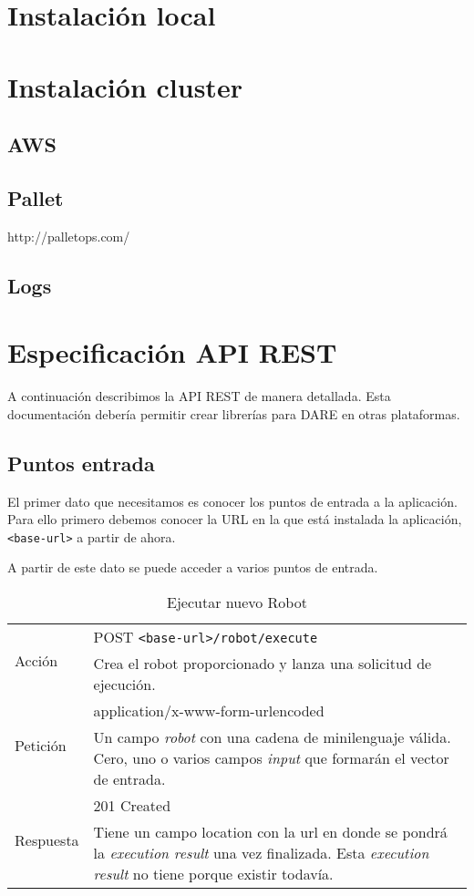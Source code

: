 \section{Instalación local}
\section{Instalación cluster}
\subsection{AWS}
\subsection{Pallet}
http://palletops.com/
\subsection{Logs}
\section{Especificación API REST}

A continuación describimos la API REST de manera detallada. Esta
documentación debería permitir crear librerías para DARE en otras
plataformas.

\subsection{Puntos entrada}
El primer dato que necesitamos es conocer los puntos de entrada a la
aplicación. Para ello primero debemos conocer la URL en la que está
instalada la aplicación, \verb+<base-url>+ a partir de ahora.

A partir de este dato se puede acceder a varios puntos de entrada.

\begin{table}[hp]
\begin{tabularx}{\textwidth}{l X}
\multirow{2}{*}{Acción}
 & POST \verb+<base-url>/robot/execute+ \\
 & Crea el robot proporcionado y lanza una solicitud de
ejecución.\\ \hline
\multirow{2}{*}{Petición}
 & application/x-www-form-urlencoded \\
 & Un campo \emph{robot} con una cadena de
  minilenguaje válida. \newline
  Cero, uno o varios campos \emph{input} que formarán el vector de
  entrada.\\ \hline
\multirow{2}{*}{Respuesta}
& 201 Created \\
& Tiene un campo location con la url en donde se pondrá la \emph{execution result}
una vez finalizada.
Esta \emph{execution result} no tiene porque existir todavía.\\
\end{tabularx}
\caption{Ejecutar nuevo Robot}
\label{execute_new_robot}
\end{table}

